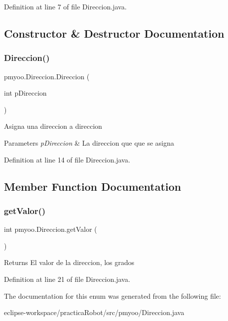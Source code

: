 Definition at line 7 of file Direccion.\+java.



\subsection{Constructor \& Destructor Documentation}
\mbox{\label{enumpmyoo_1_1_direccion_a9b65d1f2611f2530d3acee9a95a9cd81}} 
\subsubsection{\texorpdfstring{Direccion()}{Direccion()}}
{\footnotesize\ttfamily pmyoo.\+Direccion.\+Direccion (\begin{DoxyParamCaption}\item[{int}]{p\+Direccion }\end{DoxyParamCaption})}

Asigna una direccion a direccion 
\begin{DoxyParams}{Parameters}
{\em p\+Direccion} & La direccion que que se asigna \\
\hline
\end{DoxyParams}


Definition at line 14 of file Direccion.\+java.



\subsection{Member Function Documentation}
\mbox{\label{enumpmyoo_1_1_direccion_a939a949b6dc8128254357b4f51f745a7}} 
\subsubsection{\texorpdfstring{getValor()}{getValor()}}
{\footnotesize\ttfamily int pmyoo.\+Direccion.\+get\+Valor (\begin{DoxyParamCaption}{ }\end{DoxyParamCaption})}

\begin{DoxyReturn}{Returns}
El valor de la direccion, los grados 
\end{DoxyReturn}


Definition at line 21 of file Direccion.\+java.



The documentation for this enum was generated from the following file\+:\begin{DoxyCompactItemize}
\item 
eclipse-\/workspace/practica\+Robot/src/pmyoo/Direccion.\+java\end{DoxyCompactItemize}

